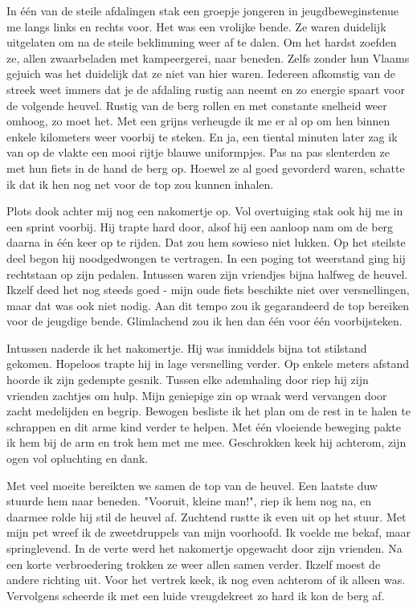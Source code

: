 \documentclass[12pt, justified, a4paper, symmetric]{tufte-book}
\begin{document}
In \'e\'en van de steile afdalingen stak een groepje jongeren in jeugdbeweginstenue me langs links en rechts voor. Het was een vrolijke bende. Ze waren duidelijk uitgelaten om na de steile beklimming weer af te dalen. Om het hardst zoefden ze, allen zwaarbeladen met kampeergerei, naar beneden. Zelfs zonder hun Vlaams gejuich was het duidelijk dat ze niet van hier waren. Iedereen afkomstig van de streek weet immers dat je de afdaling rustig aan neemt en zo energie spaart voor de volgende heuvel. Rustig van de berg rollen en met constante snelheid weer omhoog, zo moet het. Met een grijns verheugde ik me er al op om hen binnen enkele kilometers weer voorbij te steken. En ja, een tiental minuten later zag ik van op de vlakte een mooi rijtje blauwe uniformpjes. Pas na pas slenterden ze met hun fiets in de hand de berg op. Hoewel ze al goed gevorderd waren, schatte ik dat ik hen nog net voor de top zou kunnen inhalen.

Plots dook achter mij nog een nakomertje op. Vol overtuiging stak ook hij me in een sprint voorbij. Hij trapte hard door, alsof hij een aanloop nam om de berg daarna in \'e\'en keer op te rijden. Dat zou hem sowieso niet lukken. Op het steilste deel begon hij noodgedwongen te vertragen. In een poging tot weerstand ging hij rechtstaan op zijn pedalen. Intussen waren zijn vriendjes bijna halfweg de heuvel. Ikzelf deed het nog steeds goed - mijn oude fiets beschikte niet over versnellingen, maar dat was ook niet nodig. Aan dit tempo zou ik gegarandeerd de top bereiken voor de jeugdige bende. Glimlachend zou ik hen dan \'e\'en voor \'e\'en voorbijsteken.

Intussen naderde ik het nakomertje. Hij was inmiddels bijna tot stilstand gekomen. Hopeloos trapte hij in lage versnelling verder. Op enkele meters afstand hoorde ik zijn gedempte gesnik. Tussen elke ademhaling door riep hij zijn vrienden zachtjes om hulp. Mijn geniepige zin op wraak werd vervangen door zacht medelijden en begrip. Bewogen besliste ik het plan om de rest in te halen te schrappen en dit arme kind verder te helpen. Met \'e\'en vloeiende beweging pakte ik hem bij de arm en trok hem met me mee. Geschrokken keek hij achterom, zijn ogen vol opluchting en dank.

Met veel moeite bereikten we samen de top van de heuvel. Een laatste duw stuurde hem naar beneden. "Vooruit, kleine man!", riep ik hem nog na, en daarmee rolde hij stil de heuvel af. Zuchtend rustte ik even uit op het stuur. Met mijn pet wreef ik de zweetdruppels van mijn voorhoofd. Ik voelde me bekaf, maar springlevend. In de verte werd het nakomertje opgewacht door zijn vrienden. Na een korte verbroedering trokken ze weer allen samen verder. Ikzelf moest de andere richting uit. Voor het vertrek keek, ik nog even achterom of ik alleen was. Vervolgens scheerde ik met een luide vreugdekreet zo hard ik kon de berg af.
\end{document}
